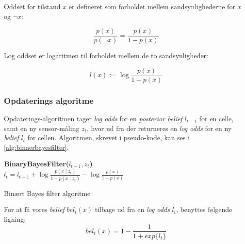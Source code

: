 Oddset for tilstand $x$ er defineret som forholdet mellem sandsynlighederne for $x$ og $\lnot x$:

\begin{equation}
\frac{p(x)}{p(\lnot x)} = \frac{p(x)}{1 - p(x)}
\end{equation}

Log oddset er logaritmen til forholdet mellem de to sandsynligheder:

\begin{equation}
l(x) := \log \frac{p(x)}{1 - p(x)}
\end{equation}

\subsubsection{Opdaterings algoritme}
Opdaterings-algoritmen tager \textit{log odds} for en \textit{posterior belief} $l_{t-1}$ for en celle, samt en ny sensor-måling $z_t$, hvor ud fra der returneres en \textit{log odds} for en ny \textit{belief} $l_t$ for cellen.
Algoritmen, skrevet i pseudo-kode, kan ses i \cref{alg:binaerbayesfilter}.

\begin{algorithm}[h]
\textbf{BinaryBayesFilter($l_{t-1}, z_t$)} \\
\Indp $l_t = l_{t-1} + \log \frac{p(x \mid z_t)}{1-p(x \mid z_t)} - \log \frac{p(x)}{1-p(x)}$ \\
\caption{Binært Bayes filter algoritme}
\label{alg:binaerbayesfilter}
\end{algorithm}


For at få vores \textit{belief} $bel_t(x)$ tilbage ud fra en \textit{log odds} $l_t$, benyttes følgende ligning:
\begin{equation}
bel_t(x) = 1 - \frac{1}{1 + exp\{l_t\}}
\end{equation}

